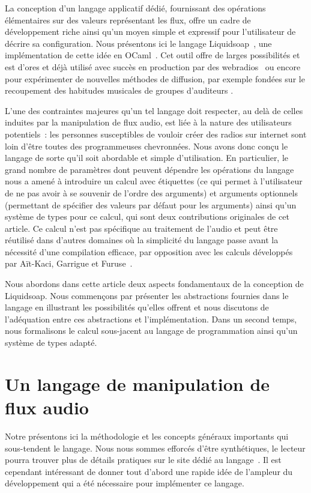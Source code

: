\documentclass[twoside]{article}
\newcommand{\liquidsoap}{Liquidsoap}
\theoremstyle{plain}
\theoremstyle{definition}
\theoremstyle{remark}
\begin{document}

La conception d'un langage applicatif dédié, fournissant
des opérations élémentaires sur des valeurs représentant les flux,
offre un cadre de développement riche ainsi qu'un moyen simple et expressif
pour l'utilisateur de décrire sa configuration. Nous présentons ici le langage
\liquidsoap~\cite{savonet}, une implémentation de cette idée en
OCaml~\cite{ocaml}. Cet outil offre de larges possibilités
et est d'ores et déjà utilisé avec succès en production par des
webradios~\cite{dolebrai,radiopi} ou encore pour expérimenter de nouvelles
méthodes de diffusion, par exemple fondées sur le recoupement des habitudes
musicales de groupes d'auditeurs \cite{baccigalupo-plaza:song-scheduler}.

L'une des contraintes majeures qu'un tel langage doit respecter, au delà de
celles induites par la manipulation de flux audio, est liée à la nature des
utilisateurs potentiels~: les personnes susceptibles de vouloir créer des radios
sur internet sont loin d'être toutes des programmeuses chevronnées. Nous avons
donc conçu le langage de sorte qu'il soit abordable et simple d'utilisation. En
particulier, le grand nombre de paramètres dont peuvent dépendre les opérations
du langage nous a amené à introduire un calcul avec étiquettes (ce qui permet
à l'utilisateur de ne pas avoir à se souvenir de l'ordre des arguments) et
arguments optionnels (permettant de spécifier des valeurs par défaut pour les
arguments) ainsi qu'un système de types pour ce calcul, qui sont deux
contributions originales de cet article. Ce calcul n'est pas spécifique au
traitement de l'audio et peut être réutilisé dans d'autres domaines où la
simplicité du langage passe avant la nécessité d'une compilation efficace, par
opposition avec les calculs développés par Aït-Kaci, Garrigue et
Furuse~\cite{ait-garrigue:label,furuse-garrigue:labelopt}.

Nous abordons dans cette article deux aspects fondamentaux de la conception de
\liquidsoap{}.
Nous commençons par présenter les abstractions fournies dans
le langage en illustrant les possibilités qu'elles offrent
et nous discutons de l'adéquation entre ces abstractions et l'implémentation.
Dans un second temps, nous formalisons le calcul sous-jacent au
langage de programmation ainsi qu'un système de types adapté.

\section{Un langage de manipulation de flux audio}
\label{sec:flux}
Notre présentons ici la méthodologie et les concepts généraux importants qui
sous-tendent le langage. Nous nous sommes efforcés d'être synthétiques,
le lecteur pourra trouver plus de détails pratiques sur le site dédié au
langage~\cite{savonet}. Il est cependant intéressant de donner tout d'abord une
rapide idée de l'ampleur du développement qui a été nécessaire pour implémenter
ce langage.
\end{document}
